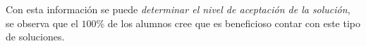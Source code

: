 


Con esta información se puede \emph{determinar el nivel de aceptación de la
    solución}, se observa que el $100\%$ de los alumnos cree que es beneficioso
contar con este tipo de soluciones.
